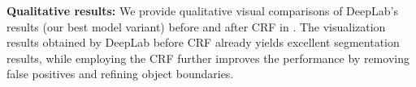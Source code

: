 
\textbf{Qualitative results:} We provide qualitative visual comparisons of DeepLab's
results (our best model variant) before and after CRF in .
The visualization results obtained by DeepLab before CRF already yields excellent
segmentation results, while employing the CRF further improves the performance by
removing false positives and refining object boundaries. 



